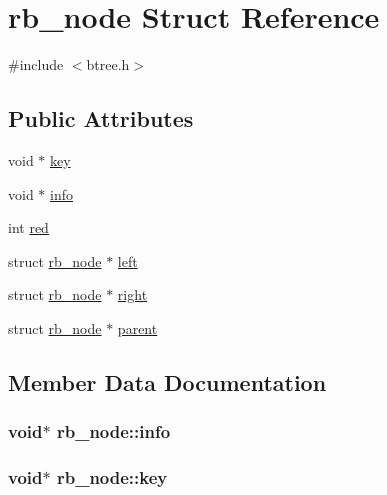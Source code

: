 \hypertarget{structrb__node}{}\section{rb\+\_\+node Struct Reference}
\label{structrb__node}


{\ttfamily \#include $<$btree.\+h$>$}

\subsection*{Public Attributes}
\begin{DoxyCompactItemize}
\item 
void $\ast$ \hyperlink{structrb__node_a46bc86b290c781b7f98310c2c59141ef}{key}
\item 
void $\ast$ \hyperlink{structrb__node_ae5c09bc9f44b7103ad16bb9c55b071ef}{info}
\item 
int \hyperlink{structrb__node_ac12d2b253512f2ee39a14fee8e07c427}{red}
\item 
struct \hyperlink{structrb__node}{rb\+\_\+node} $\ast$ \hyperlink{structrb__node_a4836de217511cad72a44303d7f868fa7}{left}
\item 
struct \hyperlink{structrb__node}{rb\+\_\+node} $\ast$ \hyperlink{structrb__node_af03024cab4c8bbc6f70391e4b4811787}{right}
\item 
struct \hyperlink{structrb__node}{rb\+\_\+node} $\ast$ \hyperlink{structrb__node_af8883b96ded96d4b743e87e5c67ebc74}{parent}
\end{DoxyCompactItemize}


\subsection{Member Data Documentation}
\hypertarget{structrb__node_ae5c09bc9f44b7103ad16bb9c55b071ef}{}
\subsubsection[{info}]{\setlength{\rightskip}{0pt plus 5cm}void$\ast$ rb\+\_\+node\+::info}\label{structrb__node_ae5c09bc9f44b7103ad16bb9c55b071ef}
\hypertarget{structrb__node_a46bc86b290c781b7f98310c2c59141ef}{}
\subsubsection[{key}]{\setlength{\rightskip}{0pt plus 5cm}void$\ast$ rb\+\_\+node\+::key}\label{structrb__node_a46bc86b290c781b7f98310c2c59141ef}
\hypertarget{structrb__node_a4836de217511cad72a44303d7f868fa7}{}
